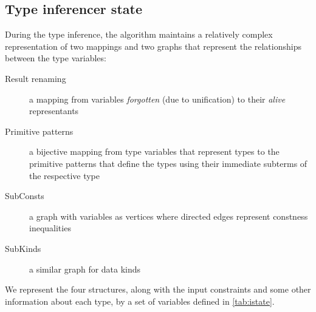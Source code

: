 \subsection{Type inferencer state}
\label{sec:istate}

During the type inference, the algorithm maintains a relatively complex representation of two mappings and two graphs that represent the relationships between the type variables:

\begin{description}
    \item[Result renaming] a mapping from variables \emph{forgotten} (due to unification) to their \emph{alive} representants
    \item[Primitive patterns] a bijective mapping from type variables that represent types to the primitive patterns that define the types using their immediate subterms of the respective type
    \item[SubConsts] a graph with variables as vertices where directed edges represent constness inequalities
    \item[SubKinds] a similar graph for data kinds
\end{description}

We represent the four structures, along with the input constraints and some other information about each type, by a set of variables defined in \cref{tab:istate}.

